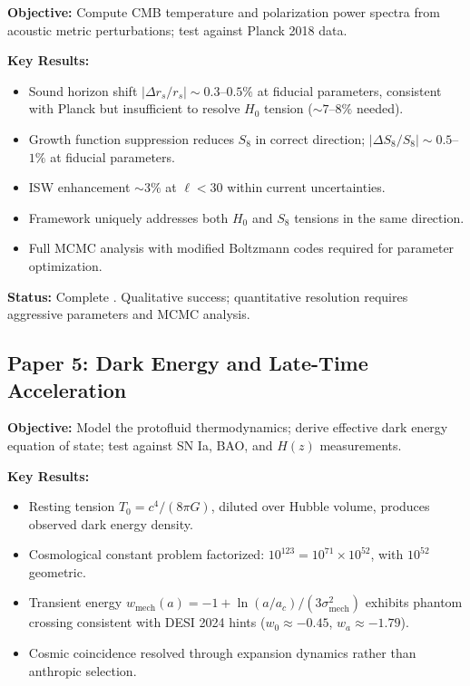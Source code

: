 \documentclass[11pt,a4paper]{article}
\newcommand{\Tzero}{\ensuremath{T_0}}
\newcommand{\wmech}{\ensuremath{w_{\mathrm{mech}}}}
\theoremstyle{definition}
\theoremstyle{remark}
\begin{document}
\textbf{Objective:} Compute CMB temperature and polarization power spectra from acoustic metric perturbations; test against Planck 2018 data.

\textbf{Key Results:}
\begin{itemize}[leftmargin=*, itemsep=0.2em]
\item Sound horizon shift $|\Delta r_s/r_s| \sim 0.3$--$0.5\%$ at fiducial parameters, consistent with Planck but insufficient to resolve $H_0$ tension ($\sim 7$--$8\%$ needed).
\item Growth function suppression reduces $S_8$ in correct direction; $|\Delta S_8/S_8| \sim 0.5$--$1\%$ at fiducial parameters.
\item ISW enhancement $\sim 3\%$ at $\ell < 30$ within current uncertainties.
\item Framework uniquely addresses both $H_0$ and $S_8$ tensions in the same direction.
\item Full MCMC analysis with modified Boltzmann codes required for parameter optimization.
\end{itemize}

\textbf{Status:} Complete \cite{Paper4}. Qualitative success; quantitative resolution requires aggressive parameters and MCMC analysis.

\subsection{Paper 5: Dark Energy and Late-Time Acceleration}
\label{sec:paper5}

\textbf{Objective:} Model the protofluid thermodynamics; derive effective dark energy equation of state; test against SN Ia, BAO, and $H(z)$ measurements.

\textbf{Key Results:}
\begin{itemize}[leftmargin=*, itemsep=0.2em]
\item Resting tension $\Tzero = c^4/(8\pi G)$, diluted over Hubble volume, produces observed dark energy density.
\item Cosmological constant problem factorized: $10^{123} = 10^{71} \times 10^{52}$, with $10^{52}$ geometric.
\item Transient energy $\wmech(a) = -1 + \ln(a/a_c)/(3\sigma_{\mathrm{mech}}^2)$ exhibits phantom crossing consistent with DESI 2024 hints ($w_0 \approx -0.45$, $w_a \approx -1.79$).
\item Cosmic coincidence resolved through expansion dynamics rather than anthropic selection.
\end{itemize}
\end{document}
